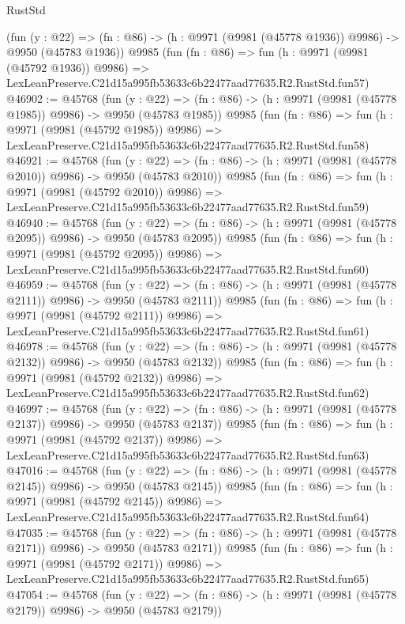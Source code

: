 \begin{lexlean}{RustStd}
\begin{coremodule}
    (fun (y : @22) =>
    (fn : @86) -> (h : @9971 (@9981 (@45778 @1936)) @9986) -> @9950 (@45783 @1936))
    @9985
    (fun (fn : @86) =>
    fun (h : @9971 (@9981 (@45792 @1936)) @9986) =>
    LexLeanPreserve.C21d15a995fb53633c6b22477aad77635.R2.RustStd.fun57)
@46902 := @45768
    (fun (y : @22) =>
    (fn : @86) -> (h : @9971 (@9981 (@45778 @1985)) @9986) -> @9950 (@45783 @1985))
    @9985
    (fun (fn : @86) =>
    fun (h : @9971 (@9981 (@45792 @1985)) @9986) =>
    LexLeanPreserve.C21d15a995fb53633c6b22477aad77635.R2.RustStd.fun58)
@46921 := @45768
    (fun (y : @22) =>
    (fn : @86) -> (h : @9971 (@9981 (@45778 @2010)) @9986) -> @9950 (@45783 @2010))
    @9985
    (fun (fn : @86) =>
    fun (h : @9971 (@9981 (@45792 @2010)) @9986) =>
    LexLeanPreserve.C21d15a995fb53633c6b22477aad77635.R2.RustStd.fun59)
@46940 := @45768
    (fun (y : @22) =>
    (fn : @86) -> (h : @9971 (@9981 (@45778 @2095)) @9986) -> @9950 (@45783 @2095))
    @9985
    (fun (fn : @86) =>
    fun (h : @9971 (@9981 (@45792 @2095)) @9986) =>
    LexLeanPreserve.C21d15a995fb53633c6b22477aad77635.R2.RustStd.fun60)
@46959 := @45768
    (fun (y : @22) =>
    (fn : @86) -> (h : @9971 (@9981 (@45778 @2111)) @9986) -> @9950 (@45783 @2111))
    @9985
    (fun (fn : @86) =>
    fun (h : @9971 (@9981 (@45792 @2111)) @9986) =>
    LexLeanPreserve.C21d15a995fb53633c6b22477aad77635.R2.RustStd.fun61)
@46978 := @45768
    (fun (y : @22) =>
    (fn : @86) -> (h : @9971 (@9981 (@45778 @2132)) @9986) -> @9950 (@45783 @2132))
    @9985
    (fun (fn : @86) =>
    fun (h : @9971 (@9981 (@45792 @2132)) @9986) =>
    LexLeanPreserve.C21d15a995fb53633c6b22477aad77635.R2.RustStd.fun62)
@46997 := @45768
    (fun (y : @22) =>
    (fn : @86) -> (h : @9971 (@9981 (@45778 @2137)) @9986) -> @9950 (@45783 @2137))
    @9985
    (fun (fn : @86) =>
    fun (h : @9971 (@9981 (@45792 @2137)) @9986) =>
    LexLeanPreserve.C21d15a995fb53633c6b22477aad77635.R2.RustStd.fun63)
@47016 := @45768
    (fun (y : @22) =>
    (fn : @86) -> (h : @9971 (@9981 (@45778 @2145)) @9986) -> @9950 (@45783 @2145))
    @9985
    (fun (fn : @86) =>
    fun (h : @9971 (@9981 (@45792 @2145)) @9986) =>
    LexLeanPreserve.C21d15a995fb53633c6b22477aad77635.R2.RustStd.fun64)
@47035 := @45768
    (fun (y : @22) =>
    (fn : @86) -> (h : @9971 (@9981 (@45778 @2171)) @9986) -> @9950 (@45783 @2171))
    @9985
    (fun (fn : @86) =>
    fun (h : @9971 (@9981 (@45792 @2171)) @9986) =>
    LexLeanPreserve.C21d15a995fb53633c6b22477aad77635.R2.RustStd.fun65)
@47054 := @45768
    (fun (y : @22) =>
    (fn : @86) -> (h : @9971 (@9981 (@45778 @2179)) @9986) -> @9950 (@45783 @2179))

\end{coremodule}
\end{lexlean}
